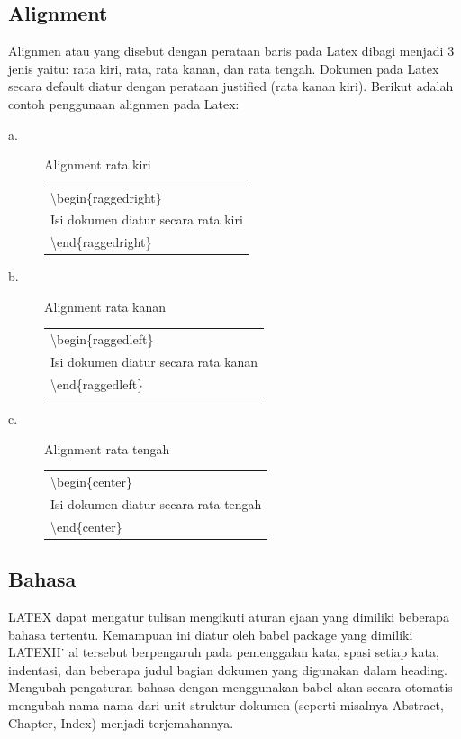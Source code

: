\subsection{Alignment}
Alignmen atau yang disebut dengan perataan baris pada Latex dibagi menjadi 3 jenis yaitu: rata kiri, rata, rata kanan, dan rata tengah. Dokumen pada Latex secara default diatur dengan perataan justified (rata kanan kiri). Berikut adalah contoh penggunaan alignmen pada Latex:
\begin{description}
\item[a.]	Alignment rata kiri\\
\begin{tabular}{|p{12cm}|}
\hline
\textbackslash begin\{raggedright\} \\
    Isi dokumen diatur secara rata kiri \\
  \textbackslash end\{raggedright\} \\
\hline
\end{tabular}
\item[b.] Alignment rata kanan\\
\begin{tabular}{|p{12cm}|}
\hline
\textbackslash begin\{raggedleft\} \\
    Isi dokumen diatur secara rata kanan \\
  \textbackslash end\{raggedleft\} \\
\hline
\end{tabular}
\item[c.]  Alignment  rata tengah\\
\begin{tabular}{|p{12cm}|}
\hline
\textbackslash begin\{center\} \\
    Isi dokumen diatur secara rata tengah \\
  \textbackslash end\{center\} \\
\hline
\end{tabular}
\end{description}
\subsection{Bahasa}
\begin{raggedleft} LATEX dapat mengatur tulisan mengikuti aturan ejaan yang dimiliki beberapa bahasa tertentu. Kemampuan ini diatur oleh babel package yang dimiliki LATEXH˙ al tersebut berpengaruh pada pemenggalan kata, spasi setiap kata, indentasi, dan beberapa judul bagian dokumen yang digunakan dalam heading. Mengubah pengaturan bahasa dengan menggunakan babel akan secara otomatis mengubah nama-nama dari unit struktur dokumen (seperti misalnya Abstract, Chapter, Index) menjadi terjemahannya.\end{raggedleft} \\[0.5 cm]


